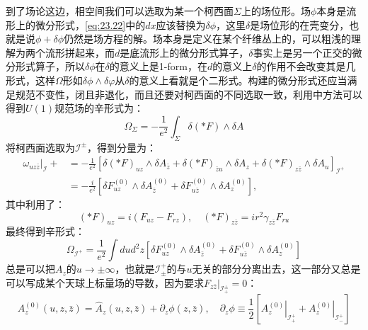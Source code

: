 到了场论这边，相空间我们可以选取为某一个柯西面$\Sigma$上的场位形。场$\phi$本身是流形上的微分形式，\ref{eq:23.22}中的$dx$应该替换为$\delta\phi$，这里$\delta$是场位形的在壳变分，也就是说$\phi+\delta \phi$仍然是场方程的解。场本身是定义在某个纤维丛上的，可以粗浅的理解为两个流形拼起来，而$d$是底流形上的微分形式算子，$\delta$事实上是另一个正交的微分形式算子，所以$\delta\phi$在$\delta$的意义上是1\mbox{-}form，在$d$的意义上$\delta$的作用不会改变其是几形式，这样$\Omega$形如$\delta\phi\wedge\delta\varphi$从$\delta$的意义上看就是个二形式。构建的微分形式还应当满足规范不变性，闭且非退化，而且还要对柯西面的不同选取一致，利用\cite{Wald:1999wa}中方法可以得到$U(1)$规范场的辛形式为：
\begin{equation}
	\Omega_{\Sigma}=-\frac{1}{e^{2}}\int_{\Sigma}\delta(*F)\wedge\delta A
\end{equation}
将柯西面选取为$\mathcal{I}^{\pm}$，得到分量为：
\begin{equation}
	\begin{aligned}
		\omega_{uz\bar{z}}|_{\mathcal{I}}+& =-\frac{1}{e^{2}}\left[\delta(*F)_{uz}\wedge\delta A_{\bar{z}}+\delta(*F)_{\bar{z}u}\wedge\delta A_{z}+\delta(*F)_{z\bar{z}}\wedge\delta A_{u}\right]_{\mathcal{I}^{+}}  \\
		&=-\frac{i}{e^{2}}\left[\delta F_{uz}^{(0)}\wedge\delta A_{\bar{z}}^{(0)}+\delta F_{u\bar{z}}^{(0)}\wedge\delta A_{z}^{(0)}\right],
	\end{aligned}
\end{equation}
其中利用了：
\begin{equation}
	(*F)_{uz}=i\left(F_{uz}-F_{rz}\right),\quad(*F)_{z\bar{z}}=ir^{2}\gamma_{z\bar{z}}F_{ru}
\end{equation}
最终得到辛形式：
\begin{equation}\label{eq:23.29}
	\Omega_{\mathcal{I}^+}=\frac{1}{e^2}\int dud^2z\left[\delta F_{uz}^{(0)}\wedge\delta A_{\bar{z}}^{(0)}+\delta F_{u\bar{z}}^{(0)}\wedge\delta A_{z}^{(0)}\right]
\end{equation}
总是可以把$A_z$的$u\to\pm {\infty}$，也就是$\mathcal{I}^+_{\pm}$的与$u$无关的部分分离出去，这一部分又总是可以写成某个天球上标量场的导数，因为要求$F_{z\bar z}|_{\mathcal{I}_{+}^{\pm}}=0$：
\begin{equation}
	A_z^{(0)}(u,z,\bar{z})=\hat{A}_z(u,z,\bar{z})+\partial_z\phi(z,\bar{z}),\quad\partial_z\phi\equiv\frac{1}{2}\left[\left.A_z^{(0)}\right|_{\mathcal I_+^+}+\left.A_z^{(0)}\right|_{\mathcal I_-^+}\right]
\end{equation}
